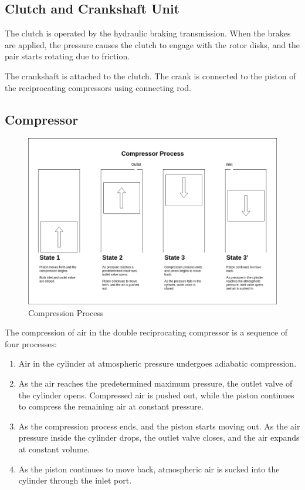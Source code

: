 \documentclass[12pt,a4paper]{article}
\begin{document}
	\subsection{Clutch and Crankshaft Unit}
		The clutch is operated by the hydraulic braking transmission. When the brakes are applied, the pressure causes the clutch to engage with the rotor disks, and the pair starts rotating due to friction.

		The crankshaft is attached to the clutch. The crank is connected to the piston of the reciprocating compressors using connecting rod.

	\subsection{Compressor}
		\begin{figure}[H]
			\centering
			\includegraphics[width=1\textwidth]{images/compression-process.png}
			\caption{Compression Process}
			\label{fig:compression_process}
		\end{figure}

		The compression of air in the double reciprocating compressor is a sequence of four processes:

		\begin{enumerate}
			\item Air in the cylinder at atmospheric pressure undergoes adiabatic compression.
			\item As the air reaches the predetermined maximum pressure, the outlet valve of the cylinder opens. Compressed air is pushed out, while the piston continues to compress the remaining air at constant pressure.
			\item As the compression process ends, and the piston starts moving out. As the air pressure inside the cylinder drops, the outlet valve closes, and the air expands at constant volume.
			\item As the piston continues to move back, atmospheric air is sucked into the cylinder through the inlet port.
		\end{enumerate}
\end{document}
